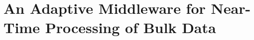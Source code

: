 \chapter{An Adaptive Middleware for Near-Time Processing of Bulk Data}\label{ch:adaptive_middleware}
